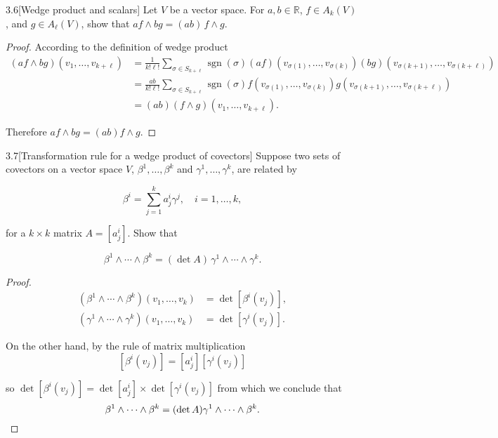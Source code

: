 \begin{problem}{3.6}[Wedge product and scalars]
Let \( V \) be a vector space. For \( a, b \in \mathbb{R} \), \( f \in A_{k}(V) \), and \( g \in A_{\ell}(V) \), show that \( a f \wedge b g = (a b) \, f \wedge g \).
\end{problem}

\begin{proof}
	According to the definition of wedge product
	\begingroup
	\allowdisplaybreaks%
	\begin{align*}
		(af \wedge bg)(v_{1}, \ldots, v_{k + \ell}) & = \frac{1}{k!\ell!}\sum_{\sigma \in S_{k + \ell}} \operatorname{sgn}(\sigma) (af)(v_{\sigma(1)}, \ldots, v_{\sigma(k)}) (bg)(v_{\sigma(k + 1)}, \ldots, v_{\sigma(k + \ell)}) \\
		                                            & = \frac{ab}{k!\ell!}\sum_{\sigma \in S_{k + \ell}} \operatorname{sgn}(\sigma) f(v_{\sigma(1)}, \ldots, v_{\sigma(k)}) g(v_{\sigma(k + 1)}, \ldots, v_{\sigma(k + \ell)})      \\
		                                            & = (ab) (f\wedge g)(v_{1}, \ldots, v_{k + \ell}).
	\end{align*}
	\endgroup

	Therefore \( af \wedge bg = (ab) f\wedge g \).
\end{proof}

\begin{problem}{3.7}[Transformation rule for a wedge product of covectors]
Suppose two sets of covectors on a vector space \( V \), \( \beta^{1}, \ldots, \beta^{k} \) and \( \gamma^{1}, \ldots, \gamma^{k} \), are related by

\[
	\beta^{i} = \sum_{j=1}^{k} a_{j}^{i} \gamma^{j}, \quad i = 1, \ldots, k,
\]

for a \( k \times k \) matrix \( A = [a_{j}^{i}] \). Show that

\[
	\beta^{1} \wedge \cdots \wedge \beta^{k} = (\det A) \, \gamma^{1} \wedge \cdots \wedge \gamma^{k}.
\]
\end{problem}

\begin{proof}
	\begingroup
	\allowdisplaybreaks%
	\begin{align*}
		(\beta^{1} \wedge \cdots \wedge \beta^{k})(v_{1}, \ldots, v_{k})   & = \det [\beta^{i}(v_{j})], \\
		(\gamma^{1} \wedge \cdots \wedge \gamma^{k})(v_{1}, \ldots, v_{k}) & = \det[\gamma^{i}(v_{j})].
	\end{align*}
	\endgroup

	On the other hand, by the rule of matrix multiplication
	\[
		[\beta^{i}(v_{j})] = [a^{i}_{j}][\gamma^{i}(v_{j})]
	\]

	so \( \det[\beta^{i}(v_{j})] = \det[a^{i}_{j}] \times \det[\gamma^{i}(v_{j})] \) from which we conclude that
	\[
		\beta^{1} \wedge \cdots \wedge \beta^{k} = (\det A) \gamma^{1} \wedge \cdots \wedge \beta^{k}.\qedhere
	\]
\end{proof}

